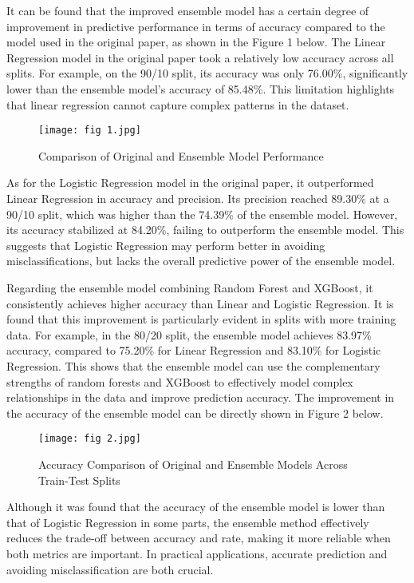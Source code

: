 \documentclass[conference]{IEEEtran}
\begin{document}
It can be found that the improved ensemble model has a certain degree of improvement in predictive performance in terms of accuracy compared to the model used in the original paper, as shown in the Figure 1 below. The Linear Regression model in the original paper took a relatively low accuracy across all splits. For example, on the 90/10 split, its accuracy was only 76.00\%, significantly lower than the ensemble model’s accuracy of 85.48\%. This limitation highlights that linear regression cannot capture complex patterns in the dataset.

\begin{figure}[h]
    \centering
    \texttt{[image: fig 1.jpg]}
    \caption{Comparison of Original and Ensemble Model Performance}
    \label{fig:performance-comparison}
\end{figure}


As for the Logistic Regression model in the original paper, it outperformed Linear Regression in accuracy and precision. Its precision reached 89.30\% at a 90/10 split, which was higher than the 74.39\% of the ensemble model. However, its accuracy stabilized at 84.20\%, failing to outperform the ensemble model. This suggests that Logistic Regression may perform better in avoiding misclassifications, but lacks the overall predictive power of the ensemble model. 


Regarding the ensemble model combining Random Forest and XGBoost, it consistently achieves higher accuracy than Linear and Logistic Regression. It is found that this improvement is particularly evident in splits with more training data. For example, in the 80/20 split, the ensemble model achieves 83.97\% accuracy, compared to 75.20\% for Linear Regression and 83.10\% for Logistic Regression. This shows that the ensemble model can use the complementary strengths of random forests and XGBoost to effectively model complex relationships in the data and improve prediction accuracy. The improvement in the accuracy of the ensemble model can be directly shown in Figure 2 below.

\begin{figure}[h]
    \centering
    \texttt{[image: fig 2.jpg]}
    \caption{Accuracy Comparison of Original and Ensemble Models Across Train-Test Splits}
    \label{fig:accuracy-comparison}
\end{figure}

Although it was found that the accuracy of the ensemble model is lower than that of Logistic Regression in some parts, the ensemble method effectively reduces the trade-off between accuracy and rate, making it more reliable when both metrics are important. In practical applications, accurate prediction and avoiding misclassification are both crucial.
\end{document}

